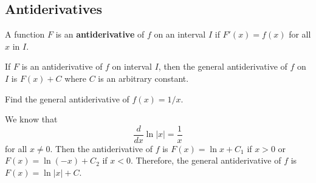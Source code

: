 \subsection{Antiderivatives}
\begin{definition}
    A function \(F\) is an \textbf{antiderivative} of \(f\) on an interval
    \(I\) if \(F'(x)=f(x)\) for all \(x\) in \(I\).
\end{definition}
\begin{theorem}
    If \(F\) is an antiderivative of \(f\) on interval \(I\), then the general
    antiderivative of \(f\) on \(I\) is \(F(x)+C\) where \(C\) is an arbitrary
    constant.
\end{theorem}
\begin{problem}
    Find the general antiderivative of \(f(x)=1/x\).
\end{problem}
\begin{solution}
    We know that \[\frac{d}{dx}\ln |x|=\frac{1}{x}\] for all \(x\neq 0\).
    Then the antiderivative of \(f\) is \(F(x)=\ln x+C_1\) if \(x>0\)
    or \(F(x)=\ln(-x)+C_2\) if \(x<0\).
    Therefore, the general antiderivative of \(f\) is \(F(x)=\ln |x|+C\).
\end{solution}